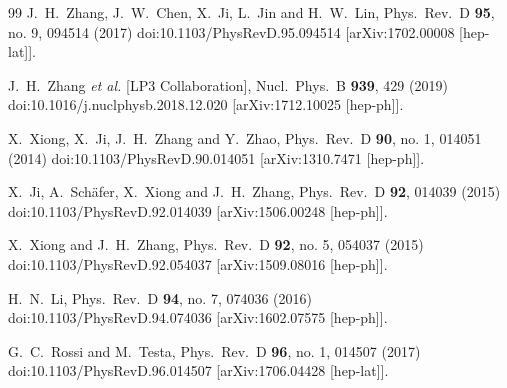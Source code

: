 \begin{thebibliography}{99}
  J.~H.~Zhang, J.~W.~Chen, X.~Ji, L.~Jin and H.~W.~Lin,
  Phys.\ Rev.\ D {\bf 95}, no. 9, 094514 (2017)
  doi:10.1103/PhysRevD.95.094514
  [arXiv:1702.00008 [hep-lat]].


  J.~H.~Zhang {\it et al.} [LP3 Collaboration],
  Nucl.\ Phys.\ B {\bf 939}, 429 (2019)
  doi:10.1016/j.nuclphysb.2018.12.020
  [arXiv:1712.10025 [hep-ph]].


  X.~Xiong, X.~Ji, J.~H.~Zhang and Y.~Zhao,
  Phys.\ Rev.\ D {\bf 90}, no. 1, 014051 (2014)
  doi:10.1103/PhysRevD.90.014051
  [arXiv:1310.7471 [hep-ph]].


  X.~Ji, A.~Sch\"afer, X.~Xiong and J.~H.~Zhang,
  Phys.\ Rev.\ D {\bf 92}, 014039 (2015)
  doi:10.1103/PhysRevD.92.014039
  [arXiv:1506.00248 [hep-ph]].


  X.~Xiong and J.~H.~Zhang,
  Phys.\ Rev.\ D {\bf 92}, no. 5, 054037 (2015)
  doi:10.1103/PhysRevD.92.054037
  [arXiv:1509.08016 [hep-ph]].


  H.~N.~Li,
  Phys.\ Rev.\ D {\bf 94}, no. 7, 074036 (2016)
  doi:10.1103/PhysRevD.94.074036
  [arXiv:1602.07575 [hep-ph]].


  G.~C.~Rossi and M.~Testa,
  Phys.\ Rev.\ D {\bf 96}, no. 1, 014507 (2017)
  doi:10.1103/PhysRevD.96.014507
  [arXiv:1706.04428 [hep-lat]].



\end{thebibliography}
